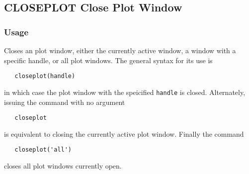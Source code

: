 %
%
%
\subsection{CLOSEPLOT Close Plot Window}
\subsubsection{Usage}
Closes an plot window, either the currently active window, a 
window with a specific handle, or all plot windows.  The general
syntax for its use is
\begin{verbatim}
   closeplot(handle)
\end{verbatim}
in which case the plot window with the speicified \verb|handle| is
closed.  Alternately, issuing the command with no argument
\begin{verbatim}
   closeplot
\end{verbatim}
is equivalent to closing the currently active plot window.  Finally
the command
\begin{verbatim}
   closeplot('all')
\end{verbatim}
closes all plot windows currently open.
